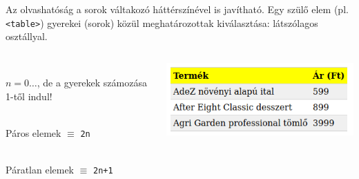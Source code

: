 \begin{frame}
  Az olvashatóság a sorok váltakozó háttérszínével is javítható. Egy szülő elem (pl. \texttt{<table>}) gyerekei (sorok) közül meghatározottak kiválasztása:  látszólagos osztállyal.
  \begin{columns}[c]
      \begin{description}[m]
        \item[\texttt{An+b}] \hfill \\ $n = 0 \dots$, de a gyerekek számozása 1-től indul!
        \item[\texttt{even}] \hfill \\ Páros elemek $\equiv$ \texttt{2n}
        \item[\texttt{odd}] \hfill \\ Páratlan elemek $\equiv$ \texttt{2n+1}
      \end{description}
      \includegraphics[width=\textwidth]{tablazat11.png}
  \end{columns} 
\end{frame}

\begin{frame}
  \begin{exampleblock}{}
    \small
    
  \end{exampleblock}
\end{frame}

